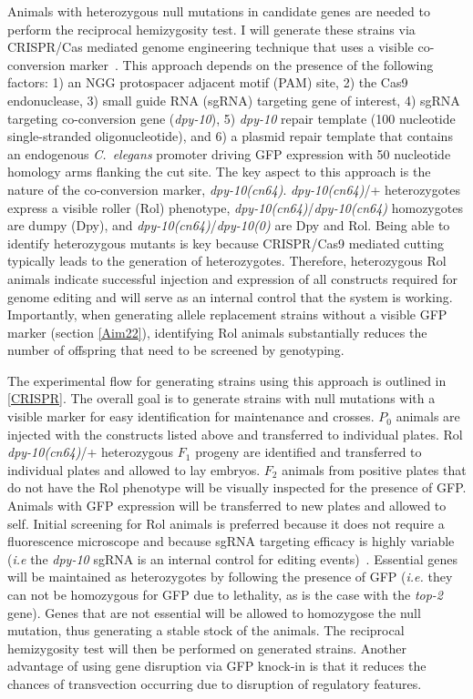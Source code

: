 \documentclass[12pt]{article}
\begin{document}
Animals with heterozygous null mutations in candidate genes are needed to perform the reciprocal hemizygosity test. I will generate these strains via CRISPR/Cas mediated genome engineering technique that uses a visible co-conversion marker~\cite{Arribere:2014ku}. This approach depends on the presence of the following factors: 1) an NGG protospacer adjacent motif (PAM) site, 2) the Cas9 endonuclease, 3) small guide RNA (sgRNA) targeting gene of interest, 4) sgRNA targeting co-conversion gene ({\it dpy-10}), 5) {\it dpy-10} repair template (100 nucleotide single-stranded oligonucleotide), and 6) a plasmid repair template that contains an endogenous {\it C.~elegans} promoter driving GFP expression with 50 nucleotide homology arms flanking the cut site. The key aspect to this approach is the nature of the co-conversion marker, {\it dpy-10(cn64)}. {\it dpy-10(cn64)}/+ heterozygotes express a visible roller (Rol) phenotype, {\it dpy-10(cn64)}/{\it dpy-10(cn64)} homozygotes are dumpy (Dpy), and {\it dpy-10(cn64)}/{\it dpy-10(0)} are Dpy and Rol. Being able to identify heterozygous mutants is key because CRISPR/Cas9 mediated cutting typically leads to the generation of heterozygotes. Therefore, heterozygous Rol animals indicate successful injection and expression of all constructs required for genome editing and will serve as an internal control that the system is working. Importantly, when generating allele replacement strains without a visible GFP marker (section \ref{Aim22}), identifying Rol animals substantially reduces the number of offspring that need to be screened by genotyping.
\vspace{5pt}

The experimental flow for generating strains using this approach is outlined in \autoref{CRISPR}. The overall goal is to generate strains with null mutations with a visible marker for easy identification for maintenance and crosses. $P_{0}$ animals are injected with the constructs listed above and transferred to individual plates. Rol {\it dpy-10(cn64)}/+ heterozygous $F_{1}$ progeny are identified and transferred to individual plates and allowed to lay embryos. $F_{2}$ animals from positive plates that do not have the Rol phenotype will be visually inspected for the presence of GFP. Animals with GFP expression will be transferred to new plates and allowed to self. Initial screening for Rol animals is preferred because it does not require a fluorescence microscope and because sgRNA targeting efficacy is highly variable ({\it i.e} the {\it dpy-10} sgRNA is an internal control for editing events)~\cite{Arribere:2014ku}. Essential genes will be maintained as heterozygotes by following the presence of GFP ({\it i.e.} they can not be homozygous for GFP due to lethality, as is the case with the {\it top-2} gene). Genes that are not essential will be allowed to homozygose the null mutation, thus generating a stable stock of the animals. The reciprocal hemizygosity test will then be performed on generated strains. Another advantage of using gene disruption via GFP knock-in is that it reduces the chances of transvection occurring due to disruption of regulatory features. 
\vspace{5pt}
\end{document}
